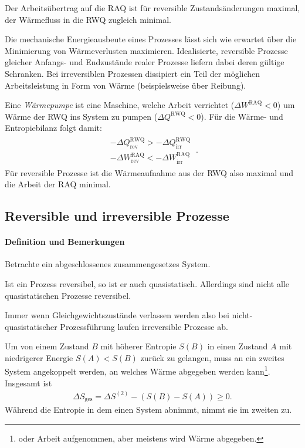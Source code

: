 \begin{formal}
     Der Arbeitsübertrag auf die RAQ ist für reversible Zustandsänderungen maximal, der Wärmefluss in die RWQ zugleich minimal. 
\end{formal}
Die mechanische Energieausbeute eines Prozesses lässt sich wie erwartet über die Minimierung von Wärmeverlusten maximieren. Idealisierte, reversible Prozesse gleicher Anfangs- und Endzustände realer Prozesse liefern dabei deren gültige Schranken. Bei irreversiblen Prozessen dissipiert ein Teil der möglichen Arbeitsleistung in Form von Wärme (beispielsweise über Reibung).

Eine \emph{Wärmepumpe} ist eine Maschine, welche Arbeit verrichtet ($\Delta W^\mathrm{RAQ}<0$) um Wärme der RWQ ins System zu pumpen ($\Delta Q^\mathrm{RWQ}<0$).
Für die Wärme- und Entropiebilanz folgt damit:
\begin{align*}
    \boxed{
    \begin{aligned}
            -\Delta Q^\mathrm{RWQ}_\mathrm{rev}>-\Delta Q^\mathrm{RWQ}_\mathrm{irr}\\
            -\Delta W^\mathrm{RAQ}_\mathrm{rev}<-\Delta W^\mathrm{RAQ}_\mathrm{irr}
    \end{aligned}
    }\:.
\end{align*}
Für reversible Prozesse ist die Wärmeaufnahme aus der RWQ also maximal und die Arbeit der RAQ minimal.





\subsection{Reversible und irreversible Prozesse}


\paragraph*{Definition und Bemerkungen }

Betrachte ein abgeschlossenes zusammengesetzes System. 

Ist ein Prozess reversibel, so ist er auch quasistatisch. Allerdings sind nicht alle quasistatischen Prozesse reversibel. 

Immer wenn Gleichgewichtszustände verlassen werden \textendash{} also bei nicht-quasistatischer Prozessführung \textendash{} laufen irreversible Prozesse ab. 


Um von einem Zustand $B$ mit höherer Entropie $S(B)$ in einen Zustand $A$ mit niedrigerer Energie $S(A)<S(B)$ zurück zu gelangen, muss an ein zweites System angekoppelt werden, an welches Wärme abgegeben werden kann\footnote{oder Arbeit aufgenommen, aber meistens wird Wärme abgegeben. }. Insgesamt ist 
\begin{align*}
    \Delta S_\mathrm{ges} = \Delta  S^{(2)}- (S(B)-S(A)) \geq 0. 
\end{align*}
Während die Entropie in dem einen System abnimmt, nimmt sie im zweiten zu. 


